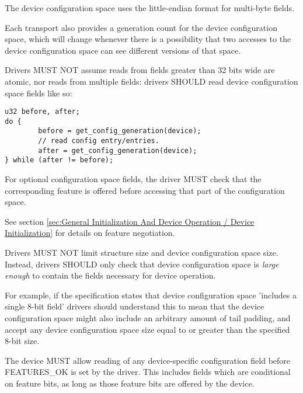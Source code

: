 \begin{note}
The device configuration space uses the little-endian format
for multi-byte fields.
\end{note}

Each transport also provides a generation count for the device configuration
space, which will change whenever there is a possibility that two
accesses to the device configuration space can see different versions of that
space.

Drivers MUST NOT assume reads from
fields greater than 32 bits wide are atomic, nor reads from
multiple fields: drivers SHOULD read device configuration space fields like so:

\begin{lstlisting}
u32 before, after;
do {
        before = get_config_generation(device);
        // read config entry/entries.
        after = get_config_generation(device);
} while (after != before);
\end{lstlisting}

For optional configuration space fields, the driver MUST check that the
corresponding feature is offered before accessing that part of the configuration
space.
\begin{note}
See section \ref{sec:General Initialization And Device Operation / Device Initialization} for details on feature negotiation.
\end{note}

Drivers MUST
NOT limit structure size and device configuration space size.  Instead,
drivers SHOULD only check that device configuration space is {\em large enough} to
contain the fields necessary for device operation.

\begin{note}
For example, if the specification states that device configuration
space 'includes a single 8-bit field' drivers should understand this to mean that
the device configuration space might also include an arbitrary amount of
tail padding, and accept any device configuration space size equal to or
greater than the specified 8-bit size.
\end{note}

The device MUST allow reading of any device-specific configuration
field before FEATURES_OK is set by the driver.  This includes fields which are
conditional on feature bits, as long as those feature bits are offered
by the device.

